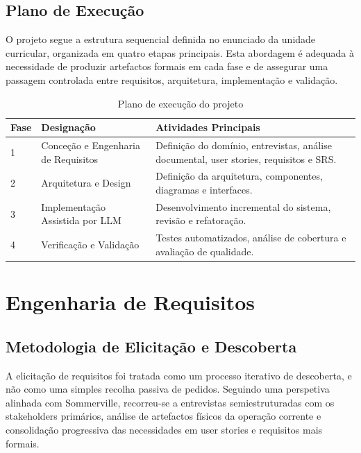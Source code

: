 \documentclass[a4paper,12pt]{scrreprt}
\begin{document}
    \section{Plano de Execução}
        O projeto segue a estrutura sequencial definida no enunciado da unidade curricular, organizada em quatro etapas principais. Esta abordagem é adequada à necessidade de produzir artefactos formais em cada fase e de assegurar uma passagem controlada entre requisitos, arquitetura, implementação e validação.

        \begin{table}[H]
            \centering
            \small
            \begin{tabular}{|p{1cm}|p{4.2cm}|p{7.8cm}|}
                \hline
                \rowcolor{gray!20!white}
                \textbf{Fase} & \textbf{Designação} & \textbf{Atividades Principais} \\
                \hline
                1 & Conceção e Engenharia de Requisitos & Definição do domínio, entrevistas, análise documental, user stories, requisitos e SRS. \\
                \hline
                2 & Arquitetura e Design & Definição da arquitetura, componentes, diagramas e interfaces. \\
                \hline
                3 & Implementação Assistida por LLM & Desenvolvimento incremental do sistema, revisão e refatoração. \\
                \hline
                4 & Verificação e Validação & Testes automatizados, análise de cobertura e avaliação de qualidade. \\
                \hline
            \end{tabular}
            \caption{Plano de execução do projeto}
        \end{table}

\chapter{Engenharia de Requisitos}

    \section{Metodologia de Elicitação e Descoberta}
        A elicitação de requisitos foi tratada como um processo iterativo de descoberta, e não como uma simples recolha passiva de pedidos. Seguindo uma perspetiva alinhada com Sommerville, recorreu-se a entrevistas semiestruturadas com os stakeholders primários, análise de artefactos físicos da operação corrente e consolidação progressiva das necessidades em user stories e requisitos mais formais.
\end{document}

